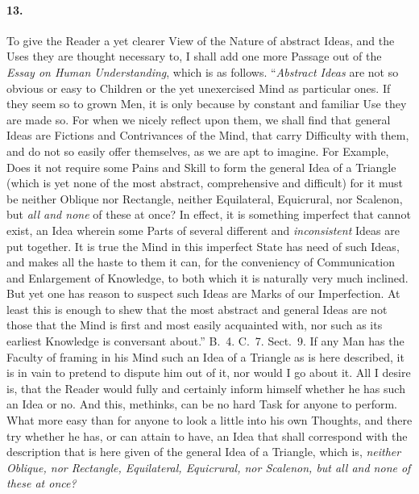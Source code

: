 \documentclass[]{article}
\newenvironment{sectionbody}{}{}
\begin{document}
\begin{sectionbody}
\paragraph{13.} To give the Reader a yet clearer View of the Nature of abstract
Ideas, and the Uses they are thought necessary to, I shall add
one more Passage out of the \emph{Essay on Human
Understanding}, which is as follows.  ``\emph{Abstract
Ideas} are not so obvious or easy to Children or the yet
unexercised Mind as particular ones.  If they seem so to grown
Men, it is only because by constant and familiar Use they are
made so.  For when we nicely reflect upon them, we shall find
that general Ideas are Fictions and Contrivances of the Mind,
that carry Difficulty with them, and do not so easily offer
themselves, as we are apt to imagine.  For Example, Does it not
require some Pains and Skill to form the general Idea of a
Triangle (which is yet none of the most abstract, comprehensive
and difficult) for it must be neither Oblique nor Rectangle,
neither Equilateral, Equicrural, nor Scalenon, but \emph{all and
none} of these at once?  In effect, it is something imperfect
that cannot exist, an Idea wherein some Parts of several
different and \emph{inconsistent} Ideas are put together.  It
is true the Mind in this imperfect State has need of such Ideas,
and makes all the haste to them it can, for the conveniency of
Communication and Enlargement of Knowledge, to both which it is
naturally very much inclined.  But yet one has reason to suspect
such Ideas are Marks of our Imperfection.  At least this is
enough to shew that the most abstract and general Ideas are not
those that the Mind is first and most easily acquainted with, nor
such as its earliest Knowledge is conversant about.''
B.~4. C.~7. Sect.~9.
If any Man has the Faculty of framing in his Mind such an Idea of
a Triangle as is here described, it is in vain to pretend to
dispute him out of it, nor would I go about it.  All I desire is,
that the Reader would fully and certainly inform himself whether
he has such an Idea or no.  And this, methinks, can be no hard
Task for anyone to perform.  What more easy than for anyone to
look a little into his own Thoughts, and there try whether he
has, or can attain to have, an Idea that shall correspond with
the description that is here given of the general Idea of a
Triangle, which is, \emph{neither Oblique, nor Rectangle,
Equilateral, Equicrural, nor Scalenon, but all and none of these
at once?}




\end{sectionbody}
\end{document}
